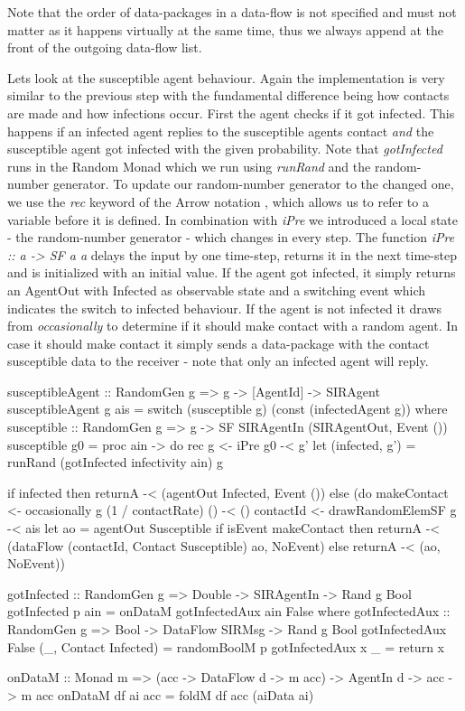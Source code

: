 Note that the order of data-packages in a data-flow is not specified and must not matter as it happens virtually at the same time, thus we always append at the front of the outgoing data-flow list.

Lets look at the susceptible agent behaviour. Again the implementation is very similar to the previous step with the fundamental difference being how contacts are made and how infections occur. First the agent checks if it got infected. This happens if an infected agent replies to the susceptible agents contact \textit{and} the susceptible agent got infected with the given probability. Note that \textit{gotInfected} runs in the Random Monad which we run using \textit{runRand} and the random-number generator. To update our random-number generator to the changed one, we use the \textit{rec} keyword of the Arrow notation \cite{paterson_new_2001}, which allows us to refer to a variable before it is defined. In combination with \textit{iPre} we introduced a local state - the random-number generator - which changes in every step. The function \textit{iPre :: a -> SF a a} delays the input by one time-step, returns it in the next time-step and is initialized with an initial value. If the agent got infected, it simply returns an AgentOut with Infected as observable state and a switching event which indicates the switch to infected behaviour.
If the agent is not infected it draws from \textit{occasionally} to determine if it should make contact with a random agent. In case it should make contact it simply sends a data-package with the contact susceptible data to the receiver - note that only an infected agent will reply.

\begin{HaskellCode}
susceptibleAgent :: RandomGen g => g -> [AgentId] -> SIRAgent
susceptibleAgent g ais = switch (susceptible g) (const (infectedAgent g))
  where
    susceptible :: RandomGen g => g -> SF SIRAgentIn (SIRAgentOut, Event ())
    susceptible g0 = proc ain -> do
      rec
        g <- iPre g0 -< g'
        let (infected, g') = runRand (gotInfected infectivity ain) g

      if infected 
        then returnA -< (agentOut Infected, Event ())
        else (do
          makeContact <- occasionally g (1 / contactRate) () -< ()
          contactId   <- drawRandomElemSF g                  -< ais
          let ao = agentOut Susceptible
          if isEvent makeContact
            then returnA -< (dataFlow (contactId, Contact Susceptible) ao, NoEvent)
            else returnA -< (ao, NoEvent))
            
gotInfected :: RandomGen g => Double -> SIRAgentIn -> Rand g Bool
gotInfected p ain = onDataM gotInfectedAux ain False
  where
    gotInfectedAux :: RandomGen g => Bool -> DataFlow SIRMsg -> Rand g Bool
    gotInfectedAux False (_, Contact Infected) = randomBoolM p
    gotInfectedAux x _ = return x
    
onDataM :: Monad m => (acc -> DataFlow d -> m acc) -> AgentIn d -> acc -> m acc
onDataM df ai acc = foldM df acc (aiData ai)
\end{HaskellCode}

